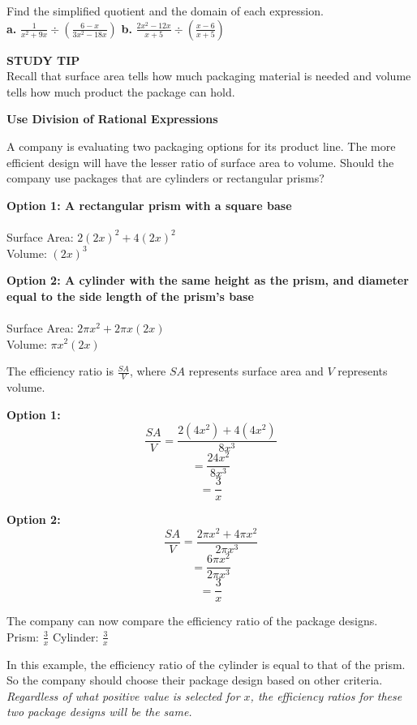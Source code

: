 \documentclass{article}
\newenvironment{concept-box}{}{}
\newenvironment{example}[1]{}{}
\newenvironment{tryit}[1]{}{}
\newcommand{\placeholder}[2]{}
\begin{document}
\begin{tryit}{5}
Find the simplified quotient and the domain of each expression. \\
\textbf{a.} $\frac{1}{x^2 + 9x} \div \left( \frac{6 - x}{3x^2 - 18x} \right)$ \qquad \textbf{b.} $\frac{2x^2 - 12x}{x + 5} \div \left( \frac{x - 6}{x + 5} \right)$
\end{tryit}

\begin{concept-box}
\textbf{STUDY TIP} \\
Recall that surface area tells how much packaging material is needed and volume tells how much product the package can hold.
\end{concept-box}

\begin{example}{6}
\textbf{Use Division of Rational Expressions}

A company is evaluating two packaging options for its product line. The more efficient design will have the lesser ratio of surface area to volume. Should the company use packages that are cylinders or rectangular prisms?

\textbf{Option 1: A rectangular prism with a square base} \\
\placeholder{diagram}{Rectangular prism with length $2x$, width $2x$, and height $2x$.} \\
Surface Area: $2(2x)^2 + 4(2x)^2$ \\
Volume: $(2x)^3$

\textbf{Option 2: A cylinder with the same height as the prism, and diameter equal to the side length of the prism's base} \\
\placeholder{diagram}{Cylinder with diameter $2x$ and height $2x$.} \\
Surface Area: $2\pi x^2 + 2\pi x(2x)$ \\
Volume: $\pi x^2(2x)$

The efficiency ratio is $\frac{SA}{V}$, where $SA$ represents surface area and $V$ represents volume.

\textbf{Option 1:}
$$ \frac{SA}{V} = \frac{2(4x^2) + 4(4x^2)}{8x^3} $$
$$ = \frac{24x^2}{8x^3} $$
$$ = \frac{3}{x} $$

\textbf{Option 2:}
$$ \frac{SA}{V} = \frac{2\pi x^2 + 4\pi x^2}{2\pi x^3} $$
$$ = \frac{6\pi x^2}{2\pi x^3} $$
$$ = \frac{3}{x} $$

The company can now compare the efficiency ratio of the package designs. \\
Prism: $\frac{3}{x}$ \qquad Cylinder: $\frac{3}{x}$

In this example, the efficiency ratio of the cylinder is equal to that of the prism. So the company should choose their package design based on other criteria. \emph{Regardless of what positive value is selected for $x$, the efficiency ratios for these two package designs will be the same.}
\end{example}
\end{document}
